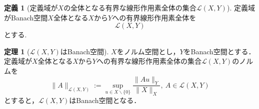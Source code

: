 \documentclass[11pt,a4paper,titlepage]{jsreport}
\theoremstyle{definition}
\newtheorem{dfn}{定義}
\newtheorem{thm}{定理}
\begin{document}
\begin{dfn}[定義域が$X$の全体となる有界な線形作用素全体の集合$\mathcal{L}(X,Y)$]
  定義域がBanach空間$X$全体となる$X$から$Y$への有界線形作用素全体を
  \begin{equation*}
    \mathcal{L}(X,Y)
  \end{equation*}
  とする.
\end{dfn}

\begin{thm}[$\mathcal{L}(X,Y)$はBanach空間]
  $X$をノルム空間とし，$Y$をBanach空間とする．定義域が$X$全体となる$X$から$Y$への有界な線形作用素全体の集合$\mathcal{L}(X,Y)$のノルムを
  \begin{equation*}
    \|A\|_{\mathcal{L}(X,Y)}:=\sup_{u\in X\backslash\{0\}} \frac{\|Au\|_Y}{\|X\|_X}, \ A\in\mathcal{L}(X,Y)
  \end{equation*}
  とすると，$\mathcal{L}(X,Y)$はBanach空間となる．
\end{thm}
\end{document}
